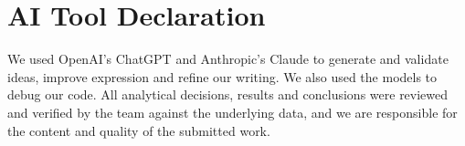 \documentclass[11pt,a4paper]{article}
\begin{document}







\label{sec:bodyend}
\newpage


\newpage
\appendix



\clearpage
\section*{AI Tool Declaration}

We used OpenAI's ChatGPT and Anthropic's Claude to generate and validate ideas,
improve expression and refine our writing. We also used the models to debug our
code. All analytical decisions, results and conclusions were reviewed and
verified by the team against the underlying data, and we are responsible for the
content and quality of the submitted work.
\end{document}
